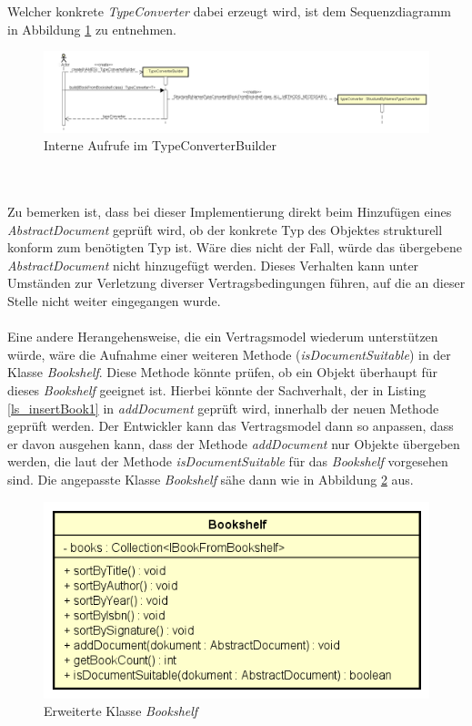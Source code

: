 \documentclass[11pt, 
ngerman,
doublespacing,
chapterinoneline, %
consistentlayout, %
]{scrartcl}
\begin{document}
Welcher konkrete \emph{TypeConverter} dabei erzeugt wird, ist dem Sequenzdiagramm in Abbildung \ref{sd_typeconverterbuilder} zu entnehmen.
\begin{figure}[h]
\centering
\includegraphics[scale=0.25]{pics/sd_createSignatureTypeConverter.png}
\caption{Interne Aufrufe im TypeConverterBuilder}
\label{sd_typeconverterbuilder}
\end{figure}\\\\
Zu bemerken ist, dass bei dieser Implementierung direkt beim Hinzufügen eines \linebreak\emph{AbstractDocument} geprüft wird, ob der konkrete Typ des Objektes strukturell konform zum benötigten Typ ist. Wäre dies nicht der Fall, würde das übergebene \linebreak\emph{AbstractDocument} nicht hinzugefügt werden. Dieses Verhalten kann unter Umständen zur Verletzung diverser Vertragsbedingungen führen, auf die an dieser Stelle nicht weiter eingegangen wurde.\\\\
Eine andere Herangehensweise, die ein Vertragsmodel wiederum unterstützen würde, wäre die Aufnahme einer weiteren Methode (\emph{isDocumentSuitable}) in der Klasse \emph{Bookshelf}. Diese Methode könnte prüfen, ob ein Objekt überhaupt für dieses \emph{Bookshelf} geeignet ist. Hierbei könnte der Sachverhalt, der in Listing \ref{ls_insertBook1} in \emph{addDocument} geprüft wird, innerhalb der neuen Methode geprüft werden. Der Entwickler kann das Vertragsmodel dann so anpassen, dass er davon ausgehen kann, dass der Methode \emph{addDocument} nur Objekte übergeben werden, die laut der Methode \emph{isDocumentSuitable} für das \emph{Bookshelf} vorgesehen sind. Die angepasste Klasse \emph{Bookshelf} sähe dann wie in Abbildung \ref{cd_erwBookshelf} aus.
\begin{figure}[h]
\centering
\includegraphics[scale=0.5]{pics/cd_erwBookshelf.png}
\caption{Erweiterte Klasse \emph{Bookshelf}}
\label{cd_erwBookshelf}
\end{figure}
\end{document}
